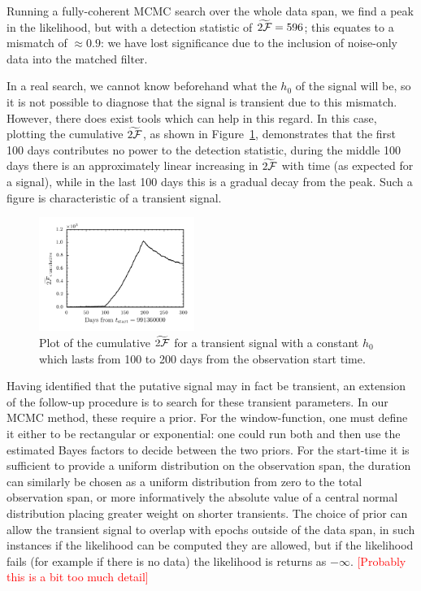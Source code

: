 \documentclass[aps, prd, twocolumn, superscriptaddress, floatfix, showpacs, nofootinbib, longbibliography]{revtex4-1}
\newcommand{\comment}[1]{\textcolor{red}{[#1]}}
\begin{document}
Running a fully-coherent MCMC search over the whole data span, we find a peak
in the likelihood, but with a detection statistic of $\widetilde{2{\mathcal{F}}}=596$;
this equates to a mismatch of $\approx0.9$: we have lost significance due
to the inclusion of noise-only data into the matched filter.

In a real search, we cannot know beforehand what the $h_0$ of the signal will
be, so it is not possible to diagnose that the signal is transient due to this
mismatch. However, there does exist tools which can help in this regard. In
this case, plotting the cumulative $\widetilde{2{\mathcal{F}}}$, as shown in
Figure~\ref{fig_transient_cumulative_twoF}, demonstrates that the first 100
days contributes no power to the detection statistic, during the middle 100
days there is an approximately linear increasing in $\widetilde{2{\mathcal{F}}}$ with time
(as expected for a signal), while in the last 100 days this is a gradual decay
from the peak. Such a figure is characteristic of a transient signal.
\begin{figure}[htb]
\centering
\includegraphics[width=0.45\textwidth]{transient_search_initial_stage_twoFcumulative}
\caption{Plot of the cumulative $\widetilde{2{\mathcal{F}}}$ for a transient signal with a
constant $h_0$ which lasts from 100 to 200 days from the observation start
time.}
\label{fig_transient_cumulative_twoF}
\end{figure}

Having identified that the putative signal may in fact be transient, an extension
of the follow-up procedure is to search for these transient parameters. In our
MCMC method, these require a prior. For the window-function, one must define it
either to be rectangular or exponential: one could run both and then use the
estimated Bayes factors to decide between the two priors. For the start-time it
is sufficient to provide a uniform distribution on the observation span, the
duration can similarly be chosen as a uniform distribution from zero to the
total observation span, or more informatively the absolute value of a central
normal distribution placing greater weight on shorter transients. The choice of
prior can allow the transient signal to overlap with epochs outside of the data
span, in such instances if the likelihood can be computed they are allowed, but
if the likelihood fails (for example if there is no data) the likelihood is
returns as $-\infty$.
\comment{Probably this is a bit too much detail}
\end{document}
